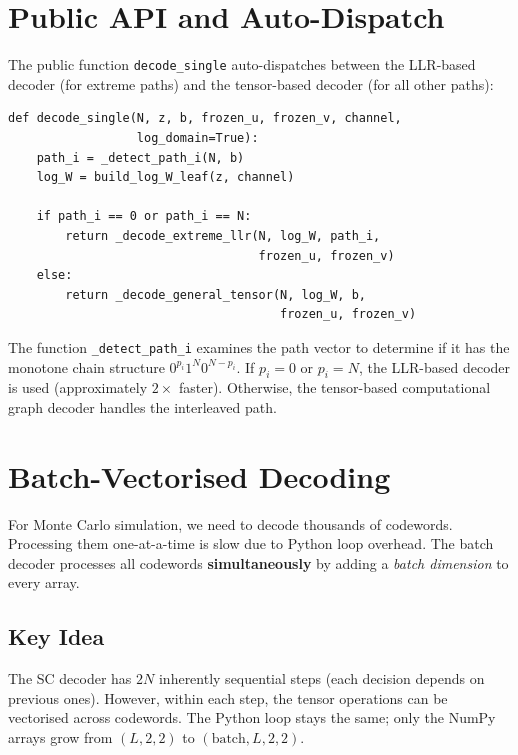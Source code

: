 \documentclass[11pt,a4paper]{article}
\begin{document}
\section{Public API and Auto-Dispatch}
\label{sec:dispatch}

The public function \texttt{decode\_single} auto-dispatches between the LLR-based decoder (for extreme paths) and the tensor-based decoder (for all other paths):

\begin{lstlisting}[caption={Public API (\texttt{decode\_single})}]
def decode_single(N, z, b, frozen_u, frozen_v, channel,
                  log_domain=True):
    path_i = _detect_path_i(N, b)
    log_W = build_log_W_leaf(z, channel)

    if path_i == 0 or path_i == N:
        return _decode_extreme_llr(N, log_W, path_i,
                                   frozen_u, frozen_v)
    else:
        return _decode_general_tensor(N, log_W, b,
                                      frozen_u, frozen_v)
\end{lstlisting}

The function \texttt{\_detect\_path\_i} examines the path vector to determine if it has the monotone chain structure $0^{p_i} 1^N 0^{N - p_i}$. If $p_i = 0$ or $p_i = N$, the LLR-based decoder is used (approximately $2\times$ faster). Otherwise, the tensor-based computational graph decoder handles the interleaved path.


\section{Batch-Vectorised Decoding}
\label{sec:batch}

For Monte Carlo simulation, we need to decode thousands of codewords. Processing them one-at-a-time is slow due to Python loop overhead. The batch decoder processes all codewords \textbf{simultaneously} by adding a \emph{batch dimension} to every array.

\subsection{Key Idea}

The SC decoder has $2N$ inherently sequential steps (each decision depends on previous ones). However, within each step, the tensor operations can be vectorised across codewords. The Python loop stays the same; only the NumPy arrays grow from $(L, 2, 2)$ to $(\text{batch}, L, 2, 2)$.
\end{document}
